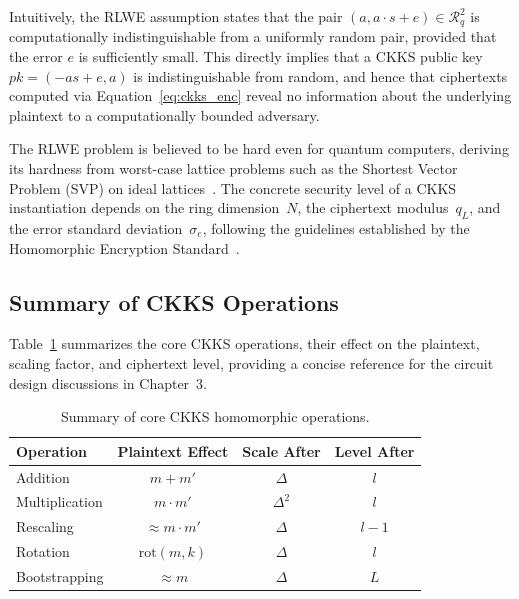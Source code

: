 Intuitively, the RLWE assumption states that the pair $(a, a \cdot s + e) \in \mathcal{R}_q^2$ is computationally indistinguishable from a uniformly random pair, provided that the error $e$ is sufficiently small. This directly implies that a CKKS public key $\mathit{pk} = (-as + e, a)$ is indistinguishable from random, and hence that ciphertexts computed via Equation~\eqref{eq:ckks_enc} reveal no information about the underlying plaintext to a computationally bounded adversary.

The RLWE problem is believed to be hard even for quantum computers, deriving its hardness from worst-case lattice problems such as the Shortest Vector Problem (SVP) on ideal lattices~\cite{lyubashevsky2010ideal}. The concrete security level of a CKKS instantiation depends on the ring dimension~$N$, the ciphertext modulus~$q_L$, and the error standard deviation~$\sigma_e$, following the guidelines established by the Homomorphic Encryption Standard~\cite{albrecht2018homomorphic}.

\subsection{Summary of CKKS Operations}

Table~\ref{tab:ckks_operations} summarizes the core CKKS operations, their effect on the plaintext, scaling factor, and ciphertext level, providing a concise reference for the circuit design discussions in Chapter~3.

\begin{table}[ht]
\centering
\caption{Summary of core CKKS homomorphic operations.}
\label{tab:ckks_operations}
\begin{tabular}{|l|c|c|c|}
\hline
\textbf{Operation} & \textbf{Plaintext Effect} & \textbf{Scale After} & \textbf{Level After} \\ \hline
Addition            & $m + m'$                  & $\Delta$              & $l$                  \\ \hline
Multiplication      & $m \cdot m'$              & $\Delta^2$            & $l$                  \\ \hline
Rescaling           & $\approx m \cdot m'$      & $\Delta$              & $l - 1$              \\ \hline
Rotation            & $\mathrm{rot}(m, k)$      & $\Delta$              & $l$                  \\ \hline
Bootstrapping       & $\approx m$               & $\Delta$              & $L$                  \\ \hline
\end{tabular}
\end{table}

